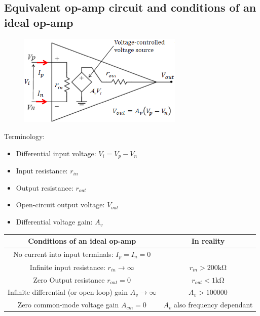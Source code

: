 \documentclass[class=report, crop=false, 12pt,a4paper]{standalone}
\begin{document}
\subsection{Equivalent op-amp circuit and conditions of an ideal op-amp}
\begin{figure}[H]
  \centering
  \includegraphics[width = 0.7\textwidth]{../img/diagram43.png}
\end{figure}
Terminology:
\begin{itemize}
  \item Differential input voltage: $V_i = V_p - V_n$
  \item Input resistance: $r_{in}$
  \item Output resistance: $r_{out}$
  \item Open-circuit output voltage: $V_{out}$
  \item Differential voltage gain: $A_v$
\end{itemize}
\begin{center}
  \begin{tabular}{ |c|c| } 
    \hline
    \textbf{Conditions of an ideal op-amp} & \textbf{In reality} \\
    \hline
    \hline
    No current into input terminals: $I_p = I_n = 0$ & \\
    \hline
    Infinite input resistance: $r_{in} \rightarrow \infty$ & $r_{in} > 200 \si{\kilo \ohm}$\\
    \hline
    Zero Output resistance $r_{out} = 0$ & $r_{out} < 1 \si{\kilo\ohm}$\\
    \hline
    Infinite differential (or open-loop) gain $A_v \rightarrow \infty$ & $A_v > 100000$\\
    \hline
    Zero common-mode voltage gain $A_{cm} = 0$ & $A_v$ also frequency dependant\\
    \hline
  \end{tabular}
\end{center}
\end{document}
